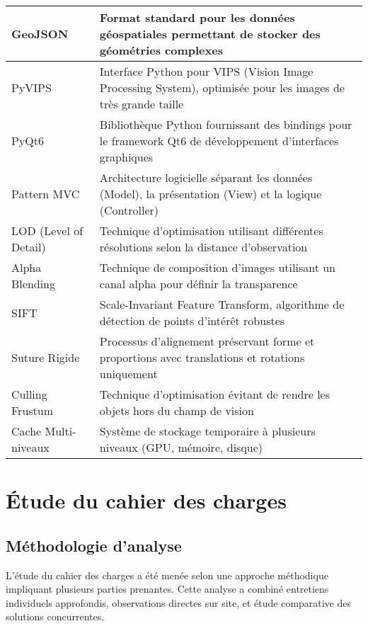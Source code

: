 \documentclass[12pt,a4paper]{report}
\begin{document}
\begin{}
\begin{longtable}{|p{4cm}|p{10cm}|}
GeoJSON & Format standard pour les données géospatiales permettant de stocker des géométries complexes \\
\hline

PyVIPS & Interface Python pour VIPS (Vision Image Processing System), optimisée pour les images de très grande taille \\
\hline

PyQt6 & Bibliothèque Python fournissant des bindings pour le framework Qt6 de développement d'interfaces graphiques \\
\hline

Pattern MVC & Architecture logicielle séparant les données (Model), la présentation (View) et la logique (Controller) \\
\hline

LOD (Level of Detail) & Technique d'optimisation utilisant différentes résolutions selon la distance d'observation \\
\hline

Alpha Blending & Technique de composition d'images utilisant un canal alpha pour définir la transparence \\
\hline

SIFT & Scale-Invariant Feature Transform, algorithme de détection de points d'intérêt robustes \\
\hline

Suture Rigide & Processus d'alignement préservant forme et proportions avec translations et rotations uniquement \\
\hline

Culling Frustum & Technique d'optimisation évitant de rendre les objets hors du champ de vision \\
\hline

Cache Multi-niveaux & Système de stockage temporaire à plusieurs niveaux (GPU, mémoire, disque) \\
\hline

\end{longtable}

\section{Étude du cahier des charges}

\subsection{Méthodologie d'analyse}

L'étude du cahier des charges a été menée selon une approche méthodique impliquant plusieurs parties prenantes. Cette analyse a combiné entretiens individuels approfondis, observations directes sur site, et étude comparative des solutions concurrentes.


\end{}
\end{document}
